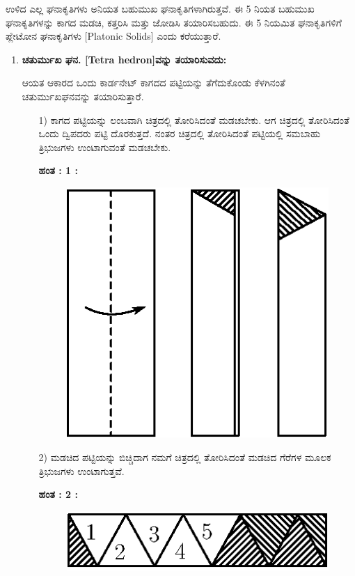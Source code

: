 ಉಳಿದ ಎಲ್ಲ ಘನಾಕೃತಿಗಳು ಅನಿಯತ ಬಹುಮುಖ ಘನಾಕೃತಿಗಳಾಗಿರುತ್ತವೆ. ಈ 5 ನಿಯತ ಬಹುಮುಖ ಘನಾಕೃತಿಗಳನ್ನು ಕಾಗದ ಮಡಚಿ, ಕತ್ತರಿಸಿ ಮತ್ತು ಜೋಡಿಸಿ ತಯಾರಿಸಬಹುದು. ಈ  5 ನಿಯಮಿತ ಘನಾಕೃತಿಗಳಿಗೆ ಪ್ಲೇಟೋನ ಘನಾಕೃತಿಗಳು [Platonic Solids] ಎಂದು ಕರೆಯುತ್ತಾರೆ. 
\begin{enumerate}
\item \textbf{ಚತುರ್ಮುಖ ಘನ. [Tetra hedron]ವನ್ನು ತಯಾರಿಸುವದು:} 

ಆಯತ ಆಕಾರದ ಒಂದು ಕಾರ್ಡನೇಟ್ ಕಾಗದದ ಪಟ್ಟಿಯನ್ನು ತೆಗೆದುಕೊಂಡು ಕೆಳಗಿನಂತೆ ಚತುರ್ಮುಖಘನವನ್ನು ತಯಾರಿಸುತ್ತಾರೆ. 
\begin{itemize}
\item[1)] ಕಾಗದ ಪಟ್ಟಿಯನ್ನು ಲಂಬವಾಗಿ ಚಿತ್ರದಲ್ಲಿ ತೋರಿಸಿದಂತೆ ಮಡಚಬೇಕು. ಆಗ ಚಿತ್ರದಲ್ಲಿ ತೋರಿಸಿದಂತೆ ಒಂದು ದ್ವಿಪದರು ಪಟ್ಟಿ ದೊರಕುತ್ತದೆ. ನಂತರ ಚಿತ್ರದಲ್ಲಿ ತೋರಿಸಿದಂತೆ ಪಟ್ಟಿಯಲ್ಲಿ ಸಮಬಾಹು ತ್ರಿಭುಜಗಳು ಉಂಟಾಗುವಂತೆ ಮಡಚಬೇಕು. 

\eject

\noindent
\textbf{ಹಂತ : 1 :}
\begin{figure}[H]
\centering
\includegraphics[scale=.98]{src/figure/chap1/fig1-18.eps}
\end{figure}

\item[2)]  ಮಡಚಿದ ಪಟ್ಟಿಯನ್ನು ಬಿಚ್ಚಿದಾಗ ನಮಗೆ ಚಿತ್ರದಲ್ಲಿ ತೋರಿಸಿದಂತೆ ಮಡಚಿದ ಗೆರೆಗಳ ಮೂಲಕ ತ್ರಿಭುಜಗಳು ಉಂಟಾಗುತ್ತವೆ. 

\noindent
\textbf{ಹಂತ : 2 :}
\begin{figure}[H]
\centering
\includegraphics[scale=.98]{src/figure/chap1/fig1-18a.eps}
\end{figure}


\end{itemize}
\end{enumerate}
